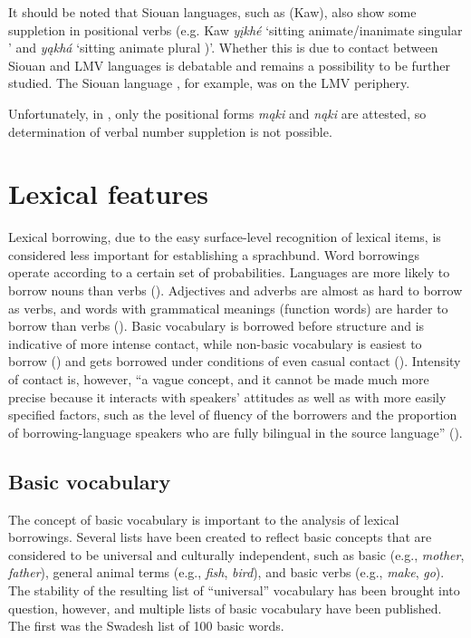 \documentclass[output=paper]{LSP/langsci}
\begin{document}
It should be noted that  Siouan languages, such as  (Kaw), also show some suppletion in positional verbs (e.g. Kaw \emph{yįkhé} `sitting animate/inanimate singular ' and \emph{yąkhá} `sitting animate plural )'. Whether this is due to contact between  Siouan and LMV languages is debatable and remains a possibility to be further studied. The  Siouan language , for example, was on the LMV periphery.

Unfortunately, in , only the positional forms \emph{mąki} and \emph{nąki} are attested, so determination of verbal number suppletion is not possible.

\section{Lexical features}

	Lexical borrowing, due to the easy surface-level recognition of lexical items, is considered less important for establishing a sprachbund. Word borrowings operate according to a certain set of probabilities. Languages are more likely to borrow nouns than verbs (\citealt[231]{Tadmoretal2010}). Adjectives and adverbs are almost as hard to borrow as verbs, and words with grammatical meanings (function words) are harder to borrow than verbs (\citealt[231]{Tadmoretal2010}). Basic vocabulary is borrowed before structure and is indicative of more intense contact, while non-basic vocabulary is easiest to borrow (\citealt[69]{Thomason2001}) and gets borrowed under conditions of even casual contact (\citealt[231]{Tadmoretal2010}). Intensity of contact is, however, “a vague concept, and it cannot be made much more precise because it interacts with speakers’ attitudes as well as with more easily specified factors, such as the level of fluency of the borrowers and the proportion of borrowing-language speakers who are fully bilingual in the source language” (\citealt[231]{Tadmoretal2010}). 

\subsection{Basic vocabulary}

	The concept of basic vocabulary is important to the analysis of lexical borrowings. Several lists have been created to reflect basic concepts that are considered to be universal and culturally independent, such as basic  (e.g., \emph{mother}, \emph{father}), general animal terms (e.g., \emph{fish}, \emph{bird}), and basic verbs (e.g., \emph{make}, \emph{go}). The stability of the resulting list of “universal” vocabulary has been brought into question, however, and multiple lists of basic vocabulary have been published. The first was the Swadesh list of 100 basic words.
\end{document}
